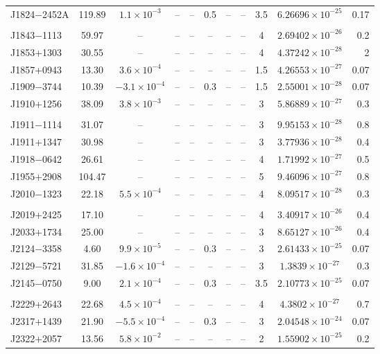 \begin{table}
\begin{tabular}{lcccccccccr}
J1824$-$2452A & 119.89  & $1.1\times 10^{-3}$ &  -- &  -- & 0.5  &  -- & -- & 3.5  & $6.26696\times 10^{-25}$ &  0.17\\
\\
J1843$-$1113 & 59.97  &  -- &  -- &  -- &  -- &  -- & -- & 4  & $2.69402\times 10^{-26}$ &  0.2\\
J1853+1303 & 30.55  &  -- &  -- &  -- &  -- &  -- & -- & 4  & $4.37242\times 10^{-28}$ &  2\\
J1857+0943 & 13.30  & $3.6\times 10^{-4}$ &  -- &  -- &  -- &  -- & -- & 1.5  & $4.26553\times 10^{-27}$ &  0.07\\
J1909$-$3744 & 10.39  & $-3.1\times 10^{-4}$ &  -- &  -- & 0.3  &  -- & -- & 1.5  & $2.55001\times 10^{-28}$ &  0.07\\
J1910+1256 & 38.09  & $3.8\times 10^{-3}$ &  -- &  -- &  -- &  -- & -- & 3  & $5.86889\times 10^{-27}$ &  0.3\\
\\
J1911$-$1114 & 31.07  &  -- &  -- &  -- &  -- &  -- & -- & 3  & $9.95153\times 10^{-28}$ &  0.8\\
J1911+1347 & 30.98  &  -- &  -- &  -- &  -- &  -- & -- & 3  & $3.77936\times 10^{-28}$ &  0.4\\
J1918$-$0642 & 26.61  &  -- &  -- &  -- &  -- &  -- & -- & 4  & $1.71992\times 10^{-27}$ &  0.5\\
J1955+2908 & 104.47  &  -- &  -- &  -- &  -- &  -- & -- & 5  & $9.46096\times 10^{-27}$ &  0.8\\
J2010$-$1323 & 22.18  & $5.5\times 10^{-4}$ &  -- &  -- &  -- &  -- & -- & 4  & $8.09517\times 10^{-28}$ &  0.3\\
\\
J2019+2425 & 17.10  &  -- &  -- &  -- &  -- &  -- & -- & 4  & $3.40917\times 10^{-26}$ &  0.4\\
J2033+1734 & 25.00  &  -- &  -- &  -- &  -- &  -- & -- & 3  & $8.65127\times 10^{-26}$ &  0.4\\
J2124$-$3358 & 4.60  & $9.9\times 10^{-5}$ &  -- &  -- & 0.3  &  -- & -- & 3  & $2.61433\times 10^{-25}$ &  0.07\\
J2129$-$5721 & 31.85  & $-1.6\times 10^{-4}$ &  -- &  -- &  -- &  -- & -- & 3  & $1.3839\times 10^{-27}$ &  0.3\\
J2145$-$0750 & 9.00  & $2.1\times 10^{-4}$ &  -- &  -- & 0.3  &  -- & -- & 3.5  & $2.10773\times 10^{-25}$ &  0.07\\
\\
J2229+2643 & 22.68  & $4.5\times 10^{-4}$ &  -- &  -- &  -- &  -- & -- & 4  & $4.3802\times 10^{-27}$ &  0.7\\
J2317+1439 & 21.90  & $-5.5\times 10^{-4}$ &  -- &  -- & 0.3  &  -- & -- & 3  & $2.04548\times 10^{-24}$ &  0.07\\
J2322+2057 & 13.56  & $5.8\times 10^{-2}$ &  -- &  -- &  -- &  -- & -- & 2  & $1.55902\times 10^{-25}$ &  0.2\\
\hline
\end{tabular}
\end{table}
